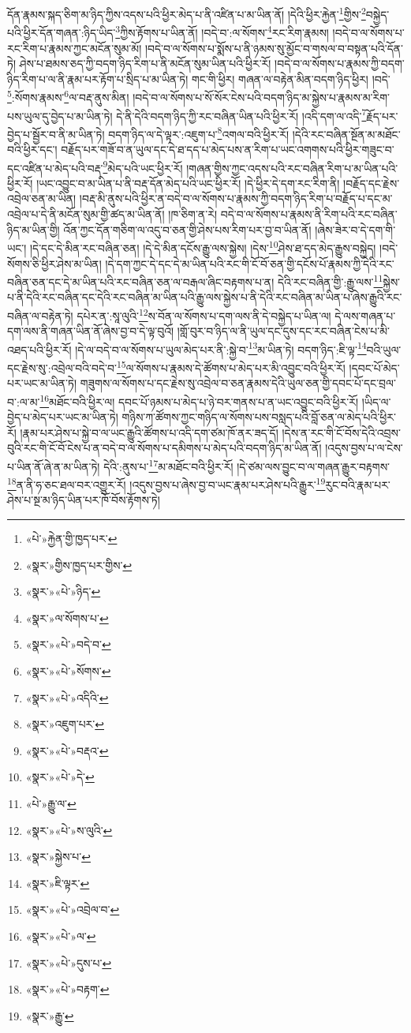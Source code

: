 དོན་རྣམས་སྐད་ཅིག་མ་ཉིད་ཀྱིས་འདས་པའི་ཕྱིར་མེད་པ་ནི་འཛིན་པ་མ་ཡིན་ནོ། །དེའི་ཕྱིར་རྐྱེན་\footnote{«པེ་»རྐྱེན་གྱི་ཁྱད་པར་}གྱིས་\footnote{«སྣར་»གྱིས་ཁྱད་པར་གྱིས་}བསྐྱེད་པའི་ཕྱིར་དོན་གཞན་:ཉིད་ཡིད་\footnote{«སྣར་»«པེ་»ཉིད་}ཀྱིས་རྟོགས་པ་ཡིན་ནོ། །བདེ་བ་:ལ་སོགས་\footnote{«སྣར་»ལ་སོགས་པ་}རང་རིག་རྣམས། །བདེ་བ་ལ་སོགས་པ་རང་རིག་པ་རྣམས་ཀྱང་མངོན་སུམ་མོ། །བདེ་བ་ལ་སོགས་པ་སྨོས་པ་ནི་ཉམས་སུ་མྱོང་བ་གསལ་བ་བསྟན་པའི་དོན་ཏེ། ཤེས་པ་ཐམས་ཅད་ཀྱི་བདག་ཉིད་རིག་པ་ནི་མངོན་སུམ་ཡིན་པའི་ཕྱིར་རོ། །བདེ་བ་ལ་སོགས་པ་རྣམས་ཀྱི་བདག་ཉིད་རིག་པ་ལ་ནི་རྣམ་པར་རྟོག་པ་སྲིད་པ་མ་ཡིན་ཏེ། གང་གི་ཕྱིར། གཞན་ལ་བརྟེན་མིན་བདག་ཉིད་ཕྱིར། །བདེ་\footnote{«སྣར་»«པེ་»བདེ་བ་}:སོགས་རྣམས་\footnote{«སྣར་»«པེ་»སོགས་}ལ་བརྡ་ནུས་མིན། །བདེ་བ་ལ་སོགས་པ་སོ་སོར་ངེས་པའི་བདག་ཉིད་མ་སྐྱེས་པ་རྣམས་མ་རིག་པས་ཡུལ་དུ་བྱེད་པ་མ་ཡིན་ཏེ། དེ་ནི་དེའི་བདག་ཉིད་ཀྱི་རང་བཞིན་ཡིན་པའི་ཕྱིར་རོ། །འདི་དག་ལ་འདི་\footnote{«སྣར་»«པེ་»འདིའི་}རྗོད་པར་བྱེད་པ་སྦྱོར་བ་ནི་མ་ཡིན་ཏེ། བདག་ཉིད་ལ་དེ་ལྟར་:འཇུག་པ་\footnote{«སྣར་»འཇུག་པར་}འགལ་བའི་ཕྱིར་རོ། །དེའི་རང་བཞིན་སྔོན་མ་མཐོང་བའི་ཕྱིར་དང་། བརྗོད་པར་གཟོ་བ་ན་ཡུལ་དང་དེ་ཐ་དད་པ་མེད་པས་ན་རིག་པ་ཡང་འགགས་པའི་ཕྱིར་གཟུང་བ་དང་འཛིན་པ་མེད་པའི་བརྡ་\footnote{«སྣར་»«པེ་»བརྡའ་}མེད་པའི་ཡང་ཕྱིར་རོ། །གཞན་གྱིས་ཀྱང་འདས་པའི་རང་བཞིན་རིག་པ་མ་ཡིན་པའི་ཕྱིར་རོ། །ཡང་འབྱུང་བ་མ་ཡིན་པ་ནི་བརྡ་དོན་མེད་པའི་ཡང་ཕྱིར་རོ། །དེ་ཕྱིར་དེ་དག་རང་རིག་ནི། །བརྗོད་དང་རྗེས་འབྲེལ་ཅན་མ་ཡིན། །བརྡ་མི་ནུས་པའི་ཕྱིར་ན་བདེ་བ་ལ་སོགས་པ་རྣམས་ཀྱི་བདག་ཉིད་རིག་པ་བརྗོད་པ་དང་མ་འབྲེལ་པ་དེ་ནི་མངོན་སུམ་གྱི་ཚད་མ་ཡིན་ནོ། །ཁ་ཅིག་ན་རེ། བདེ་བ་ལ་སོགས་པ་རྣམས་ནི་རིག་པའི་རང་བཞིན་ཉིད་མ་ཡིན་གྱི། འོན་ཀྱང་དོན་གཅིག་ལ་འདུ་བ་ཅན་གྱི་ཤེས་པས་རིག་པར་བྱ་བ་ཡིན་ནོ། །ཞེས་ཟེར་བ་དེ་དག་གི་ཡང་། །དེ་དང་དེ་མིན་རང་བཞིན་ཅན། །དེ་དེ་མིན་དངོས་རྒྱུ་ལས་སྐྱེས། །དེས་\footnote{«སྣར་»«པེ་»དེ་}ཤེས་ཐ་དད་མེད་རྒྱུས་བསྐྱེད། །བདེ་སོགས་ཅི་ཕྱིར་ཤེས་མ་ཡིན། །དེ་དག་ཀྱང་དེ་དང་དེ་མ་ཡིན་པའི་རང་གི་ངོ་བོ་ཅན་གྱི་དངོས་པོ་རྣམས་ཀྱི་དེའི་རང་བཞིན་ཅན་དང་དེ་མ་ཡིན་པའི་རང་བཞིན་ཅན་ལ་བརྒལ་ཞིང་བརྟགས་པ་ན། དེའི་རང་བཞིན་གྱི་:རྒྱུ་ལས་\footnote{«པེ་»རྒྱུ་ལ་}སྐྱེས་པ་ནི་དེའི་རང་བཞིན་དང་དེའི་རང་བཞིན་མ་ཡིན་པའི་རྒྱུ་ལས་སྐྱེས་པ་ནི་དེའི་རང་བཞིན་མ་ཡིན་པ་ཞེས་རྒྱུའི་རང་བཞིན་ལ་བརྟེན་ཏེ། དཔེར་ན་:སཱ་ལུའི་\footnote{«སྣར་»«པེ་»ས་ལུའི་}ས་བོན་ལ་སོགས་པ་དག་ལས་ནི་དེ་བསྐྱེད་པ་ཡིན་ལ། དེ་ལས་གཞན་པ་དག་ལས་ནི་གཞན་ཡིན་ནོ་ཞེས་བྱ་བ་དེ་ལྟ་བུའོ། །གློ་བུར་བ་ཉིད་ལ་ནི་ཡུལ་དང་དུས་དང་རང་བཞིན་ངེས་པ་མི་འཐད་པའི་ཕྱིར་རོ། །དེ་ལ་བདེ་བ་ལ་སོགས་པ་ཡུལ་མེད་པར་ནི་:སྐྱེ་བ་\footnote{«སྣར་»སྐྱེས་པ་}མ་ཡིན་ཏེ། བདག་ཉིད་:ཇི་ལྟ་\footnote{«སྣར་»ཇི་ལྟར་}བའི་ཡུལ་དང་རྗེས་སུ་:འབྲེལ་བའི་བདེ་བ་\footnote{«སྣར་»«པེ་»འབྲེལ་བ་}ལ་སོགས་པ་རྣམས་དེ་ཚོགས་པ་མེད་པར་མི་འབྱུང་བའི་ཕྱིར་རོ། །དབང་པོ་མེད་པར་ཡང་མ་ཡིན་ཏེ། གཟུགས་ལ་སོགས་པ་དང་རྗེས་སུ་འབྲེལ་བ་ཅན་རྣམས་དེའི་ཡུལ་ཅན་གྱི་དབང་པོ་དང་བྲལ་བ་:ལ་མ་\footnote{«སྣར་»«པེ་»ལ་}མཐོང་བའི་ཕྱིར་ལ། དབང་པོ་ཉམས་པ་མེད་པ་ཉེ་བར་གནས་པ་ན་ཡང་འབྱུང་བའི་ཕྱིར་རོ། །ཡིད་ལ་བྱེད་པ་མེད་པར་ཡང་མ་ཡིན་ཏེ། གཉིས་ཀ་ཚོགས་ཀྱང་གཉིད་ལ་སོགས་པས་བསླད་པའི་བློ་ཅན་ལ་མེད་པའི་ཕྱིར་རོ། །རྣམ་པར་ཤེས་པ་སྐྱེ་བ་ལ་ཡང་རྒྱུའི་ཚོགས་པ་འདི་དག་ཙམ་ཁོ་ནར་ཟད་དོ། །དེས་ན་རང་གི་ངོ་བོས་དེའི་འབྲས་བུའི་རང་གི་ངོ་བོ་ངེས་པ་ན་བདེ་བ་ལ་སོགས་པ་དམིགས་པ་མེད་པའི་བདག་ཉིད་མ་ཡིན་ནོ། །འདུས་བྱས་པ་ལ་ངེས་པ་ཡིན་ནོ་ཞེ་ན་མ་ཡིན་ཏེ། དེའི་:ནུས་པ་\footnote{«སྣར་»«པེ་»དུས་པ་}མ་མཐོང་བའི་ཕྱིར་རོ། །དེ་ཙམ་ལས་བྱུང་བ་ལ་གཞན་རྒྱུར་བརྟགས་\footnote{«སྣར་»«པེ་»བརྟག་}ན་ནི་ཧ་ཅང་ཐལ་བར་འགྱུར་རོ། །འདུས་བྱས་པ་ཞེས་བྱ་བ་ཡང་རྣམ་པར་ཤེས་པའི་རྒྱུར་\footnote{«སྣར་»རྒྱུ་}རུང་བའི་རྣམ་པར་ཤེས་པ་སྔ་མ་ཉིད་ཡིན་པར་ཁོ་བོས་རྟོགས་ཏེ། 